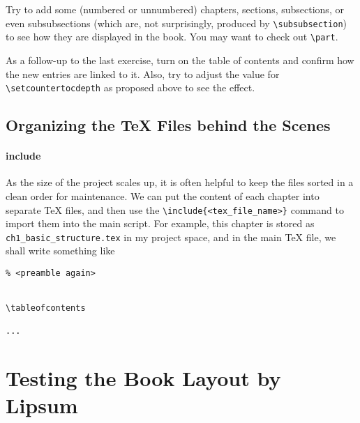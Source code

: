 \begin{exercisebox}
\begin{Exercise}
Try to add some (numbered or unnumbered) chapters, sections, subsections, or even subsubsections (which are, not surprisingly, produced by \texttt{\textbackslash subsubsection}) to see how they are displayed in the book. You may want to check out \texttt{\textbackslash part}.
\end{Exercise}
\begin{Exercise}
As a follow-up to the last exercise, turn on the table of contents and confirm how the new entries are linked to it. Also, try to adjust the value for \texttt{\textbackslash setcounter{tocdepth}} as proposed above to see the effect.
\end{Exercise}
\end{exercisebox}

\subsection{Organizing the \TeX{} Files behind the Scenes}
\label{subsection:TeXorg}

\paragraph{include}
As the size of the project scales up, it is often helpful to keep the files sorted in a clean order for maintenance. We can put the content of each chapter into separate \TeX{} files, and then use the \texttt{\textbackslash include\{<tex\_file\_name>\}} command to import them into the main script. For example, this chapter is stored as \texttt{ch1\_basic\_structure.tex} in my project space, and in the main \TeX{} file, we shall write something like
\begin{lstlisting}
% <preamble again>


\tableofcontents

...

\end{lstlisting}

\section{Testing the Book Layout by Lipsum}

